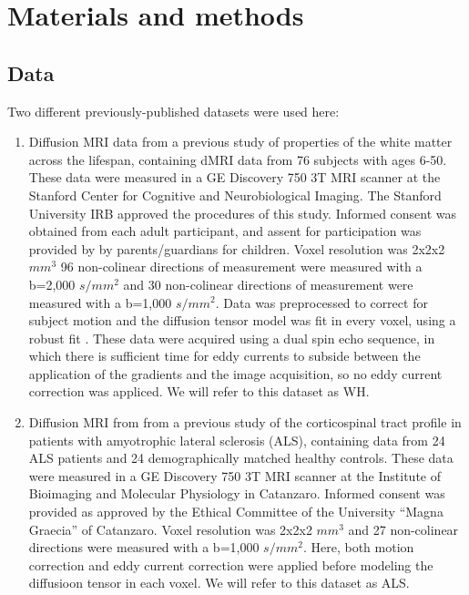 \section*{Materials and methods}

\subsection*{Data}

Two different previously-published datasets were used here:

\begin{enumerate}

\item Diffusion MRI data from a previous study of properties of the white matter
across the lifespan\cite{yeatman2014lifespan}, containing dMRI data from 76
subjects with ages 6-50. These data were measured in a GE Discovery 750 3T MRI
scanner at the Stanford Center for Cognitive and Neurobiological Imaging. The
Stanford University IRB approved the procedures of this study. Informed consent
was obtained from each adult participant, and assent for participation was
provided by by parents/guardians for children. Voxel resolution was 2x2x2 $mm^3$
96 non-colinear directions of measurement were measured with a b=2,000 $s/mm^2$
and 30 non-colinear directions of measurement were measured with a b=1,000
$s/mm^2$. Data was preprocessed to correct for subject motion and the diffusion
tensor model \cite{basser1994mr} was fit in every voxel, using a robust fit
\cite{chang2005restore}. These data were acquired using a dual spin echo
sequence, in which there is sufficient time for eddy currents to subside between
the application of the gradients and the image acquisition, so no eddy current
correction was appliced. We will refer to this dataset as WH.

\item Diffusion MRI from from a previous study of the corticospinal tract
profile in patients with amyotrophic lateral sclerosis
(ALS)\cite{sarica2017corticospinal}, containing data from 24 ALS patients and 24
demographically matched healthy controls. These data were measured in a GE
Discovery 750 3T MRI scanner at the Institute of Bioimaging and Molecular
Physiology in Catanzaro. Informed consent was provided as approved by the
Ethical Committee of the University ``Magna Graecia'' of Catanzaro. Voxel
resolution was 2x2x2 $mm^3$ and 27 non-colinear directions were measured with a
b=1,000 $s/mm^2$. Here, both motion correction and eddy current correction were
applied before modeling the diffusioon tensor in each voxel. We will refer to
this dataset as ALS.

\end{enumerate}

